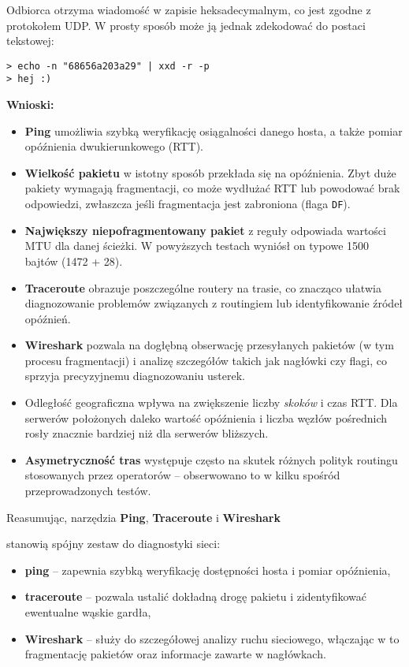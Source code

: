 \documentclass[12pt]{article}
\begin{document}
Odbiorca otrzyma wiadomość w zapisie heksadecymalnym, co jest zgodne z protokołem UDP. 
W prosty sposób może ją jednak zdekodować do postaci tekstowej:
\begin{verbatim}
> echo -n "68656a203a29" | xxd -r -p
> hej :)
\end{verbatim}

\vspace{1\baselineskip}
\textbf{Wnioski: }
\begin{itemize}
  \item \textbf{Ping} umożliwia szybką weryfikację osiągalności danego hosta, a także pomiar opóźnienia dwukierunkowego (RTT).
  \item \textbf{Wielkość pakietu} w istotny sposób przekłada się na opóźnienia. Zbyt duże pakiety wymagają fragmentacji, co może wydłużać RTT lub powodować brak odpowiedzi, zwłaszcza jeśli fragmentacja jest zabroniona (flaga \texttt{DF}).
  \item \textbf{Największy niepofragmentowany pakiet} z reguły odpowiada wartości MTU dla danej ścieżki. W powyższych testach wyniósł on typowe 1500 bajtów (1472 + 28).
  \item \textbf{Traceroute} obrazuje poszczególne routery na trasie, co znacząco ułatwia diagnozowanie problemów związanych z routingiem lub identyfikowanie źródeł opóźnień.
  \item \textbf{Wireshark} pozwala na dogłębną obserwację przesyłanych pakietów (w tym procesu fragmentacji) i analizę szczegółów takich jak nagłówki czy flagi, co sprzyja precyzyjnemu diagnozowaniu usterek.
  \item Odległość geograficzna wpływa na zwiększenie liczby \textit{skoków} i czas RTT. Dla serwerów położonych daleko wartość opóźnienia i liczba węzłów pośrednich rosły znacznie bardziej niż dla serwerów bliższych.
  \item \textbf{Asymetryczność tras} występuje często na skutek różnych polityk routingu stosowanych przez operatorów – obserwowano to w kilku spośród przeprowadzonych testów.
\end{itemize}

Reasumując, narzędzia \textbf{Ping}, \textbf{Traceroute} i \textbf{Wireshark} \par stanowią spójny zestaw do diagnostyki sieci:
\begin{itemize}
  \item \textbf{ping} – zapewnia szybką weryfikację dostępności hosta i pomiar opóźnienia,
  \item \textbf{traceroute} – pozwala ustalić dokładną drogę pakietu i zidentyfikować ewentualne wąskie gardła,
  \item \textbf{Wireshark} – służy do szczegółowej analizy ruchu sieciowego, włączając w to fragmentację pakietów oraz informacje zawarte w nagłówkach.
\end{itemize}
\end{document}
